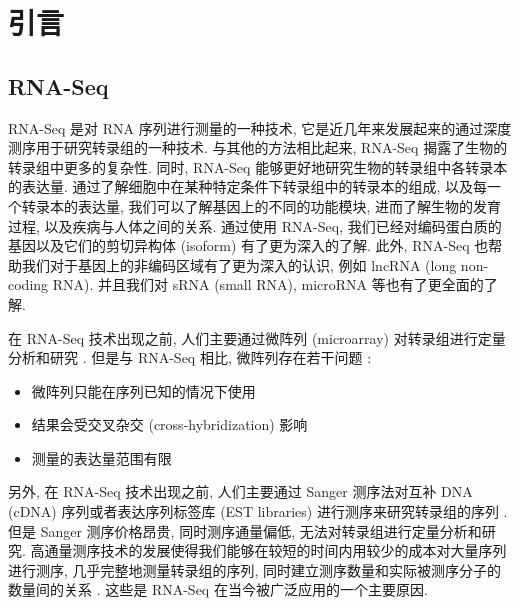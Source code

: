 \chapter{引言}

\section{RNA-Seq}
\nocite{wang2009rna, ozsolak2010rna}

RNA-Seq 是对 RNA 序列进行测量的一种技术, 
它是近几年来发展起来的通过深度测序用于研究转录组的一种技术. 
与其他的方法相比起来, RNA-Seq 揭露了生物的转录组中更多的复杂性. 
同时, RNA-Seq 能够更好地研究生物的转录组中各转录本的表达量. 
通过了解细胞中在某种特定条件下转录组中的转录本的组成, 
以及每一个转录本的表达量, 我们可以了解基因上的不同的功能模块, 
进而了解生物的发育过程, 以及疾病与人体之间的关系. 
通过使用 RNA-Seq, 我们已经对编码蛋白质的基因以及它们的剪切异构体 (isoform) 有了更为深入的了解. 
此外, RNA-Seq 也帮助我们对于基因上的非编码区域有了更为深入的认识, 
例如 lncRNA (long non-coding RNA).
并且我们对 sRNA (small RNA), microRNA 等也有了更全面的了解. 
\cite{pickrell2010understanding, encode, nagalakshmi2008transcriptional, 
tang2009mrna, banfai2012long, mortazavi2008mapping, wang2008alternative, 
katz2010analysis, deng2011isoform, lu2010function, mercer2011targeted, 
howald2012combining, lalonde2011rna, djebali2012landscape, 
derrien2012gencode, gerstein2012architecture, fairfax2012genetics, 
morrissy2011extensive, howald2012combining, park2012rna, 
tilgner2012deep, orom2010long, mercer2011human, chung2011computational, 
gingeras2009implications, roy2010identification, axtell2011vive, 
berezikov2010evolutionary, cherbas2011transcriptional, anders2012detecting, 
stoeckius2009large, lau2009abundant}

在 RNA-Seq 技术出现之前, 人们主要通过微阵列 (microarray) 对转录组进行定量分析和研究 \cite{schena1995quantitative}. 
但是与 RNA-Seq 相比, 微阵列存在若干问题 \cite{wang2009rna}: 
\begin{itemize}
\item 微阵列只能在序列已知的情况下使用

\item 结果会受交叉杂交 (cross-hybridization) 影响 \cite{okoniewski2006hybridization, royce2007toward}

\item 测量的表达量范围有限
\end{itemize}
另外, 在 RNA-Seq 技术出现之前, 人们主要通过 Sanger 测序法对互补 DNA (cDNA) 序列或者表达序列标签库 (EST libraries) 进行测序来研究转录组的序列 \cite{boguski1994gene, gerhard2004status}. 
但是 Sanger 测序价格昂贵, 同时测序通量偏低, 无法对转录组进行定量分析和研究. 
高通量测序技术的发展使得我们能够在较短的时间内用较少的成本对大量序列进行测序, 
几乎完整地测量转录组的序列, 
同时建立测序数量和实际被测序分子的数量间的关系 \cite{marioni2008rna}. 
这些是 RNA-Seq 在当今被广泛应用的一个主要原因. 

